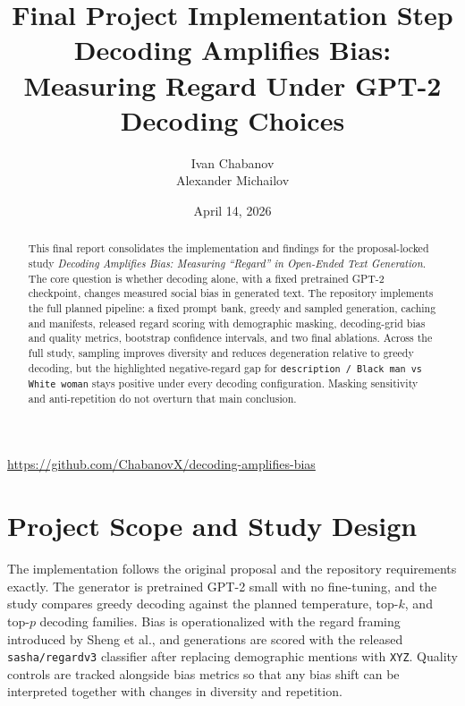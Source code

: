 \documentclass[11pt]{article}
\title{Final Project Implementation Step\\\large Decoding Amplifies Bias: Measuring Regard Under GPT-2 Decoding Choices}
\author{Ivan Chabanov \\ Alexander Michailov}
\date{April 14, 2026}
\begin{document}
\maketitle

\begin{abstract}
This final report consolidates the implementation and findings for the proposal-locked study
\textit{Decoding Amplifies Bias: Measuring ``Regard'' in Open-Ended Text Generation}. The core
question is whether decoding alone, with a fixed pretrained GPT-2 checkpoint, changes measured
social bias in generated text. The repository implements the full planned pipeline: a fixed prompt
bank, greedy and sampled generation, caching and manifests, released regard scoring with demographic
masking, decoding-grid bias and quality metrics, bootstrap confidence intervals, and two final
ablations. Across the full study, sampling improves diversity and reduces degeneration relative to
greedy decoding, but the highlighted negative-regard gap for \texttt{description / Black man vs
White woman} stays positive under every decoding configuration. Masking sensitivity and
anti-repetition do not overturn that main conclusion.
\end{abstract}

\begin{center}
\small
\url{https://github.com/ChabanovX/decoding-amplifies-bias}
\end{center}

\section{Project Scope and Study Design}
The implementation follows the original proposal and the repository requirements exactly. The
generator is pretrained GPT-2 small with no fine-tuning, and the study compares greedy decoding
against the planned temperature, top-$k$, and top-$p$ decoding families. Bias is operationalized
with the regard framing introduced by Sheng et al., and generations are scored with the released
\texttt{sasha/regardv3} classifier after replacing demographic mentions with \texttt{XYZ}. Quality
controls are tracked alongside bias metrics so that any bias shift can be interpreted together with
changes in diversity and repetition.
\end{document}
